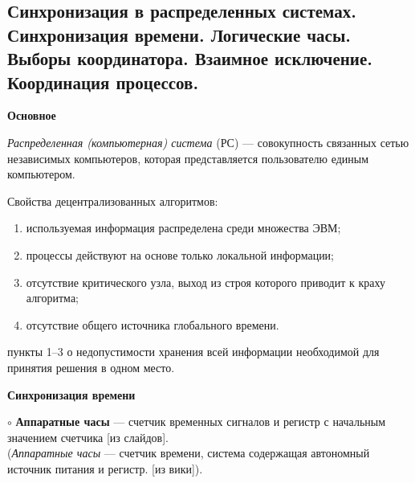 \newcommand{\notsure}[1]{(видимо: #1)}
\newcommand{\aboba}[2]{\textbf{\LARGE dop #1. #2}}
\newcommand{\multicom}[1]{}
\newcommand{\lulz}[1]{}
\newcommand{\wantsayInstead}[1]{}

\subsection{Синхронизация  в  распределенных  системах.  Синхронизация  времени.  Логические  часы.  Выборы координатора. Взаимное исключение. Координация процессов.}

\bigbreak

\centerline{\textbf{Основное}}

\textit{Распределенная (компьютерная) система} (РС) --– совокупность связанных
сетью независимых компьютеров, которая представляется
пользователю единым компьютером. 


Свойства децентрализованных алгоритмов:
\vspace{-0.7em}
\begin{enumerate}
\setlength\itemsep{-0.4em}
\item используемая информация распределена среди множества ЭВМ;
\item процессы действуют на основе только локальной информации;
\item отсутствие критического узла, выход из строя которого приводит к краху алгоритма;
\item отсутствие общего источника глобального времени.
\end{enumerate}
пункты 1--3 о недопустимости хранения всей информации необходимой для принятия решения в одном место.


\centerline{\textbf{Синхронизация времени}}

$\circ$
\textbf{Аппаратные часы} --- счетчик временных сигналов и регистр с начальным значением счетчика [из слайдов].
\\
(\textit{Аппаратные часы} --- счетчик времени, система содержащая автономный источник питания и регистр. [из вики]).

